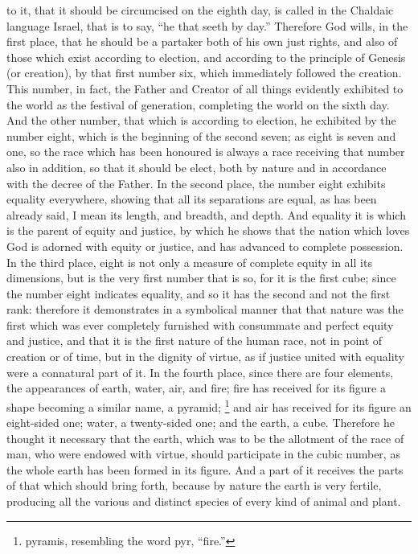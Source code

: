 to it, that it should be circumcised on the eighth day, is called in the Chaldaic language Israel, that
is to say, ``he that seeth by day.'' Therefore God wills, in the first place, that he should be a partaker
both of his own just rights, and also of those which exist according to election, and according to the
principle of Genesis (or creation), by that first number six, which immediately followed the creation.
This number, in fact, the Father and Creator of all things evidently exhibited to the world as the
festival of generation, completing the world on the sixth day. And the other number, that which is
according to election, he exhibited by the number eight, which is the beginning of the second
seven; as eight is seven and one, so the race which has been honoured is always a race receiving
that number also in addition, so that it should be elect, both by nature and in accordance with the
decree of the Father. In the second place, the number eight exhibits equality everywhere, showing
that all its separations are equal, as has been already said, I mean its length, and breadth, and
depth. And equality it is which is the parent of equity and justice, by which he shows that the nation
which loves God is adorned with equity or justice, and has advanced to complete possession. In
the third place, eight is not only a measure of complete equity in all its dimensions, but is the very
first number that is so, for it is the first cube; since the number eight indicates equality, and so it
has the second and not the first rank: therefore it demonstrates in a symbolical manner that that
nature was the first which was ever completely furnished with consummate and perfect equity and
justice, and that it is the first nature of the human race, not in point of creation or of time, but in the
dignity of virtue, as if justice united with equality were a connatural part of it. In the fourth place,
since there are four elements, the appearances of earth, water, air, and fire; fire has received for
its figure a shape becoming a similar name, a pyramid; \footnote{pyramis, resembling the word pyr, ``fire.''} and air
has received for its figure an eight-sided one; water, a twenty-sided one; and the earth, a cube.
Therefore he thought it necessary that the earth, which was to be the allotment of the race of man,
who were endowed with virtue, should participate in the cubic number, as the whole earth has been
formed in its figure. And a part of it receives the parts of that which should bring forth, because by
nature the earth is very fertile, producing all the various and distinct species of every kind of animal
and plant.

